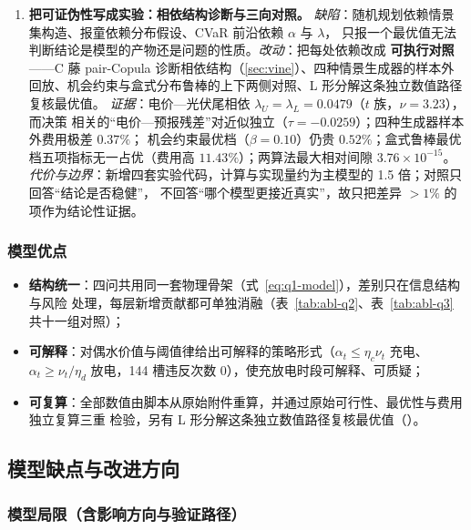 \begin{enumerate}[label=\textbf{创新 \arabic*.},leftmargin=4.2em]
    情景来自 334 天历史，不能外推机制突变。
  \item \textbf{把可证伪性写成实验：相依结构诊断与三向对照。}
    \emph{缺陷}：随机规划依赖情景集构造、报童依赖分布假设、CVaR 前沿依赖 \(\alpha\) 与 \(\lambda\)，
    只报一个最优值无法判断结论是模型的产物还是问题的性质。\emph{改动}：把每处依赖改成
    \textbf{可执行对照}——C 藤 pair-Copula 诊断相依结构（\ref{sec:vine}）、四种情景生成器的样本外
    回放、机会约束与盒式分布鲁棒的上下两侧对照、L 形分解这条独立数值路径复核最优值。
    \emph{证据}：电价—光伏尾相依 \(\lambda_U=\lambda_L=0.0479\)（\(t\) 族，\(\nu=3.23\)），而决策
    相关的“电价—预报残差”对近似独立（\(\tau=-0.0259\)）；四种生成器样本外费用极差 \(0.37\%\)；
    机会约束最优档（\(\beta=0.10\)）仍贵 \(0.52\%\)；盒式鲁棒最优档五项指标无一占优（费用高
    \(11.43\%\)）；两算法最大相对间隙 \(3.76\times10^{-15}\)。
    \emph{代价与边界}：新增四套实验代码，计算与实现量约为主模型的 1.5 倍；对照只回答“结论是否稳健”，
    不回答“哪个模型更接近真实”，故只把差异 \(>1\%\) 的项作为结论性证据。
\end{enumerate}

\subsubsection{模型优点}

\begin{itemize}
  \item \textbf{结构统一}：四问共用同一套物理骨架（式~\eqref{eq:q1-model}），差别只在信息结构与风险
        处理，每层新增贡献都可单独消融（表~\ref{tab:abl-q2}、表~\ref{tab:abl-q3} 共十一组对照）；
  \item \textbf{可解释}：对偶水价值与阈值律给出可解释的策略形式（\(\alpha_t\le\eta_c\nu_t\)
        充电、\(\alpha_t\ge\nu_t/\eta_d\) 放电，144 槽违反次数 0），使充放电时段可解释、可质疑；
  \item \textbf{可复算}：全部数值由脚本从原始附件重算，并通过原始可行性、最优性与费用独立复算三重
        检验，另有 L 形分解这条独立数值路径复核最优值（）。
\end{itemize}

\subsection{模型缺点与改进方向}

\subsubsection{模型局限（含影响方向与验证路径）}

